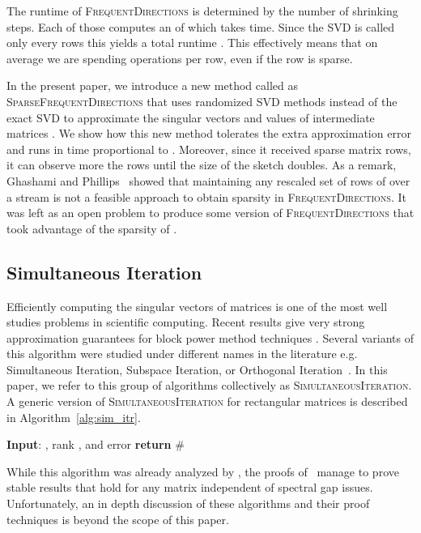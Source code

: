 \documentclass[11pt]{article}
\newcommand{\fd}{\textsc{FrequentDirections}\xspace}
\newcommand{\sfd}{\textsc{SparseFrequentDirections}\xspace}
\newcommand{\si}{\textsc{SimultaneousIteration}\xspace}
\begin{document}
The runtime of \fd is determined by the number of shrinking steps. 
Each of those computes an  of  which takes  time. 
Since the SVD is called only every  rows this yields a total runtime . This effectively means that on average we are spending  operations per row, even if the row is sparse. 

In the present paper, we introduce a new method called as \sfd that uses randomized SVD methods instead of the exact SVD to approximate the singular vectors and values of intermediate matrices .  We show how this new method tolerates the extra approximation error and runs in time proportional to . Moreover, since it received sparse matrix rows, it can observe more the  rows until the size of the sketch doubles.
As a remark, Ghashami and Phillips~\cite{ghashami2014relative} showed that maintaining any rescaled set of  rows of  over a stream is not a feasible approach to obtain sparsity in \fd. It was left as an open problem to produce some version of \fd that took advantage of the sparsity of .  




\subsection{Simultaneous  Iteration}
Efficiently computing the singular vectors of matrices is one of the most well studies problems in scientific computing.
Recent results give very strong approximation guarantees for block power method techniques \cite{rokhlin2009randomized}\cite{woolfe2008fast}\cite{liberty2007randomized}\cite{halko2011finding}. Several variants of this algorithm were studied under different names in the literature e.g. Simultaneous  Iteration, Subspace Iteration, or Orthogonal Iteration~\cite{golub2012matrix}. 
In this paper, we refer to this group of algorithms collectively as \si. 
A generic version of \si for rectangular matrices is described in Algorithm~\ref{alg:sim_itr}.
\begin{algorithm}[H]
\caption{\si}
\label{alg:sim_itr}
\begin{algorithmic}
\STATE \textbf{Input}: , rank , and error 
\STATE 
\STATE 
\STATE 
\STATE \textbf{return}  \hfill \# 
\end{algorithmic}
\end{algorithm}

While this algorithm was already analyzed by \cite{golub2012matrix}, the proofs of~\cite{rokhlin2009randomized, halko2011finding, musco2015stronger, witten2013randomized} manage to prove stable results that hold for any matrix independent of spectral gap issues.
Unfortunately, an in depth discussion of these algorithms and their proof techniques is beyond the scope of this paper. 
\end{document}
